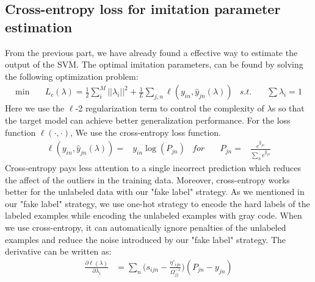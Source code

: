 \subsection{Cross-entropy loss for imitation parameter estimation}
From the previous part, we have already found a effective way to estimate the output of the SVM. The optimal imitation parameters, can be found by solving the following optimization problem:
\begin{equation}\label{eq:loo_loss}
\begin{aligned}
\min \quad& L_c\left(\lambda\right)=\frac{1}{2}\sum_i^M||\lambda_i||^2+\frac{1}{L}\sum_{j,n}\ell\left(y_{in},\hat{y}_{jn}\left(\lambda\right)\right) &
s.t. \quad& \sum\lambda_i=1
\end{aligned}
\end{equation}
Here we use the $\ell$-2 regularization term to control the complexity of $\lambda$s so that the target model can achieve better generalization performance. For the loss function $\ell(\cdot,\cdot)$, We use the cross-entropy loss function.
\begin{equation}\label{eq:ce}
\begin{aligned}
\ell\left(y_{in},\hat{y}_{jn}\left(\lambda\right)\right)=&y_{in}\log(P_{jn}) & for \quad&
P_{jn} =& \frac{e^{\hat{y}_{jn}}}{\sum_{h} e^{\hat{y}_{jh}}}
\end{aligned}
\end{equation}
Cross-entropy pays less attention to a single incorrect prediction which reduces the affect of the outliers in the training data. Moreover, cross-entropy works better for the unlabeled data with our "fake label" strategy. As we mentioned in our "fake label" strategy, we use one-hot strategy to encode the hard labels of the labeled examples while encoding the unlabeled examples with gray code. When we use cross-entropy, it can automatically ignore penalties of the unlabeled examples and reduce the noise introduced by our "fake label" strategy. 
The derivative can be written as:
\begin{equation}\label{eq:p}
\begin{aligned}
\frac{\partial \ell(\lambda)}{\partial \lambda_i}&=\sum_n\bigg(s_{ijn}-\frac{{\eta}'_{ijn}}{\Omega_{jj}^{-1}}\bigg)\left(P_{jn}-{y}_{jn}\right)
\end{aligned}
\end{equation}
